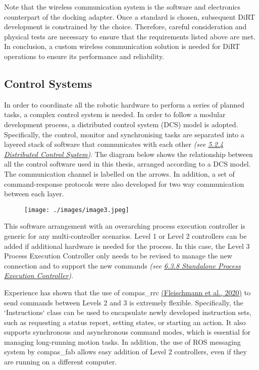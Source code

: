 Note that the wireless communication system is the software and electronics counterpart of the docking adapter. Once a standard is chosen, subsequent DiRT development is constrained by the choice. Therefore, careful consideration and physical tests are necessary to ensure that the requirements listed above are met. In conclusion, a custom wireless communication solution is needed for DiRT operations to ensure its performance and reliability.

\subsection{Control Systems}

In order to coordinate all the robotic hardware to perform a series of planned tasks, a complex control system is needed. In order to follow a modular development process, a distributed control system (DCS) model is adopted. Specifically, the control, monitor and synchronising tasks are separated into a layered stack of software that communicates with each other \textit{(see \ul{5.2.4 Distributed Control System})}. The diagram below shows the relationship between all the control software used in this thesis, arranged according to a DCS model. The communication channel is labelled on the arrows. In addition, a set of command-response protocols were also developed for two way communication between each layer. 

\begin{figure}[H]
\texttt{[image: ./images/image3.jpeg]}
\end{figure}


This software arrangement with an overarching process execution controller is generic for any multi-controller scenarios. Level 1 or Level 2 controllers can be added if additional hardware is needed for the process. In this case, the Level 3 Process Execution Controller only needs to be revised to manage the new connection and to support the new commands \textit{(see \ul{6.3.8 Standalone Process Execution Controller})}. 

Experience has shown that the use of compas\_rrc \href{https://www.zotero.org/google-docs/?svtqbp}{(Fleischmann et al., 2020)} to send commands between Levels 2 and 3 is extremely flexible. Specifically, the `Instructions` class can be used to encapsulate newly developed instruction sets, such as requesting a status report, setting states, or starting an action. It also supports synchronous and asynchronous command modes, which is essential for managing long-running motion tasks. In addition, the use of ROS messaging system by compas\_fab allows easy addition of Level 2 controllers, even if they are running on a different computer. 

